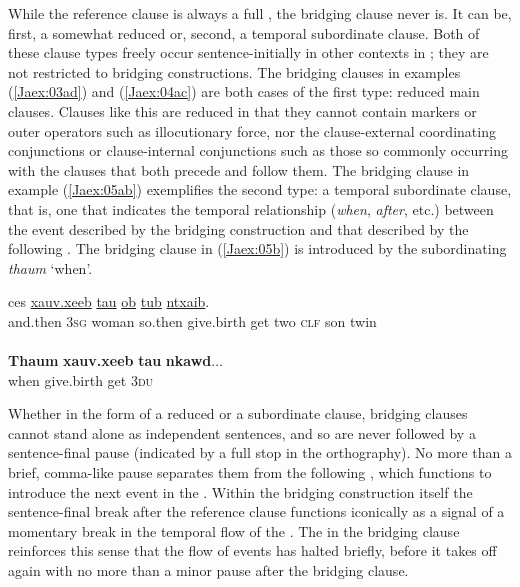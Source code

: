 \documentclass[output=paper]{LSP/langsci}
\begin{document}
While the reference clause is always a full , the bridging clause never is. It can be, first, a somewhat reduced  or, second, a temporal subordinate clause. Both of these clause types freely occur sentence-initially in other contexts in ; they are not restricted to bridging constructions. 
The bridging clauses in examples (\ref{Jaex:03ad}) and (\ref{Jaex:04ac}) are both cases of the first type: reduced main clauses. Clauses like this are reduced in that they cannot contain  markers or outer operators such as illocutionary force, nor the clause-external coordinating conjunctions or clause-internal  conjunctions such as those so commonly occurring with the clauses that both precede and follow them. The bridging clause in example (\ref{Jaex:05ab}) exemplifies the second type: a temporal subordinate clause, that is, one that indicates the temporal relationship (\textit{when}, \textit{after}, etc.) between the event described by the bridging construction and that described by the following . The bridging clause in (\ref{Jaex:05b}) is introduced by the subordinating  \textit{thaum } `when'.
 
\begin{exe}
\ex \label{Jaex:05ab}
\begin{xlist}
\ex \label{Jaex:05a}
\gll ces \underline{} \underline{} \underline{} \underline{xauv.xeeb} \underline{tau} \underline{ob} \underline{} \underline{tub} \underline{ntxaib}.\\
and.then 3\textsc{sg} woman so.then give.birth get two \textsc{clf} son twin\\
\glt {}\\
\ex \label{Jaex:05b}
\gll \textbf{Thaum} \textbf{xauv.xeeb} \textbf{tau} \textbf{nkawd}...\\     	      
    when  give.birth get 3\textsc{du}\\
\glt {} \citep[][31]{vang90}
\end{xlist}
\end{exe}

Whether in the form of a reduced  or a subordinate clause, bridging clauses cannot stand alone as independent sentences, and so are never followed by a sentence-final pause (indicated by a full stop in the orthography). No more than a brief, comma-like pause separates them from the following , which functions to introduce the next event in the . Within the bridging construction itself the sentence-final break after the reference clause functions iconically as a signal of a momentary break in the temporal flow of the . The  in the bridging clause reinforces this sense that the  flow of events has halted briefly, before it takes off again with no more than a minor pause after the bridging clause.
 
\end{document}
